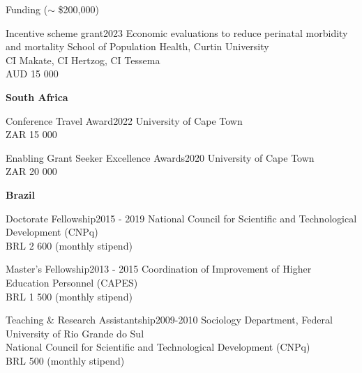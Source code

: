 \begin{rSection}{Funding ($\sim$ \$200,000)}
\begin{rSubsection}
{Incentive scheme grant}{2023}
{Economic evaluations to reduce perinatal morbidity and mortality}
{School of Population Health, Curtin University}\\
{CI Makate, CI Hertzog, CI Tessema}\\
{AUD 15 000}
\end{rSubsection}

\vspace{1em}

\begin{center}
\large \textbf{South Africa}
\end{center}

\par

\begin{rSubsection}
{Conference Travel Award}{2022}
{University of Cape Town}\\
{ZAR 15 000}
\end{rSubsection}

\begin{rSubsection}
{Enabling Grant Seeker Excellence Awards}{2020}
{University of Cape Town}\\
{ZAR 20 000}
\end{rSubsection}

\vspace{1em}

\begin{center}
\large \textbf {Brazil}
\end{center}

\par

\begin{rSubsection}
{Doctorate Fellowship}{2015 - 2019}
{National Council for Scientific and Technological Development (CNPq)}\\
{BRL 2 600 (monthly stipend)}
\end{rSubsection}

\begin{rSubsection}
{Master’s Fellowship}{2013 - 2015}
{Coordination of Improvement of Higher Education Personnel (CAPES)}\\
{BRL 1 500 (monthly stipend)}
\end{rSubsection}

\begin{rSubsection}
{Teaching \& Research Assistantship}{2009-2010}
{Sociology Department, Federal University of Rio Grande do Sul}\\
{National Council for Scientific and Technological Development (CNPq)}\\
{BRL 500 (monthly stipend)}
\end{rSubsection}


\end{rSection}

